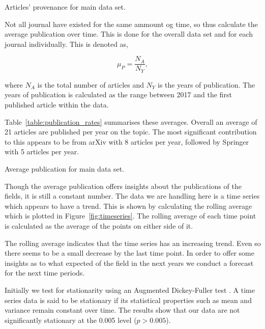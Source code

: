 \documentclass{article}
\theoremstyle{definition}
\begin{document}
\begin{table}[!hbtp]
    \begin{center}
    
    \end{center}
    \caption{Articles' provenance for main data set.} %
    \label{table:provenance}
\end{table}

Not all journal have existed for the same ammount og time, so thus calculate the average
publication over time. This is done for the overall data set and for each journal
individually. This is denoted as,

\[ \mu_P = \frac{N_A}{N_Y},\]

where \(N_A\) is the total number of articles and \(N_Y\) is the years of publication.
The years of publication is calculated as the range between 2017 and the first published
article within the data.

Table~\ref{table:publication_rates} summarises these averages. Overall an average of
21 articles are published per year on the topic. The most significant contribution
to this appears to be from arXiv with 8 articles per year, followed by Springer
with 5 articles per year.

\begin{table}[!hbtp]
    \begin{center}
    
    \end{center}
    \caption{Average publication for main data set.} %
    \label{table:publication_rates}
\end{table}

Though the average publication offers insights about the publications of the
fields, it is still a constant number. The data we are handling here is a time
series which appears to have a trend. This is shown
by calculating the rolling average which is plotted in Figure~\ref{fig:timeseries}.
The rolling average of each time
point is calculated as the average of the points on either side of it.

The rolling average indicates that the time series has an increasing trend.
Even so there seems to be a small decrease by the last time point. In order
to offer some insights as to what expected of the field in the next years
we conduct a forecast for the next time periods.

Initially we test for stationarity using an Augmented Dickey-Fuller test
\cite{HARRIS1992381}. A time series data is said to be stationary if its
statistical properties such as mean and variance remain constant over time.
The results show that our data are not significantly stationary at the 0.005 level
(\(p > 0.005\)).
\end{document}
